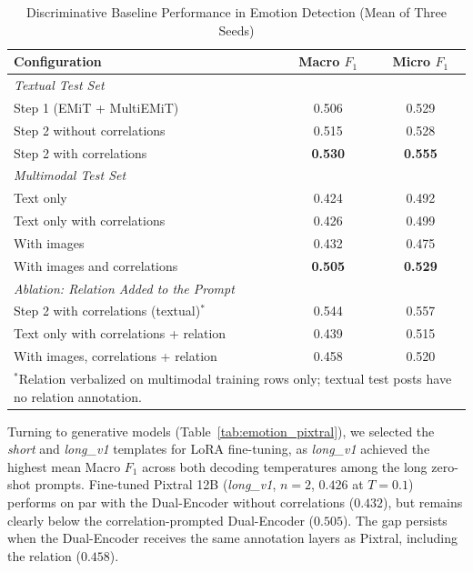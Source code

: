 \begin{table}[!t]
\centering
\caption{Discriminative Baseline Performance in Emotion Detection (Mean of Three Seeds)}
\label{tab:emotion_baselines}
\footnotesize
\renewcommand{\arraystretch}{1.05}
\begin{tabular}{l c c}
\hline
\textbf{Configuration} & \textbf{Macro $F_1$} & \textbf{Micro $F_1$} \\
\hline
\multicolumn{3}{l}{\textit{Textual Test Set}} \\
Step 1 (EMiT + MultiEMiT) & 0.506 & 0.529 \\
Step 2 without correlations & 0.515 & 0.528 \\
Step 2 with correlations & \textbf{0.530} & \textbf{0.555} \\
\hline
\multicolumn{3}{l}{\textit{Multimodal Test Set}} \\
Text only & 0.424 & 0.492 \\
Text only with correlations & 0.426 & 0.499 \\
With images & 0.432 & 0.475 \\
With images and correlations & \textbf{0.505} & \textbf{0.529} \\
\hline
\multicolumn{3}{l}{\textit{Ablation: Relation Added to the Prompt}} \\
Step 2 with correlations (textual)$^{*}$ & 0.544 & 0.557 \\
Text only with correlations + relation & 0.439 & 0.515 \\
With images, correlations + relation & 0.458 & 0.520 \\
\hline
\multicolumn{3}{p{0.92\columnwidth}}{\footnotesize $^{*}$Relation verbalized on multimodal training rows only; textual test posts have no relation annotation.} \\
\end{tabular}
\end{table}

Turning to generative models (Table~\ref{tab:emotion_pixtral}), we selected the \textit{short} and \textit{long\_v1} templates for LoRA fine-tuning, as \textit{long\_v1} achieved the highest mean Macro $F_1$ across both decoding temperatures among the long zero-shot prompts. Fine-tuned Pixtral 12B (\textit{long\_v1}, $n=2$, $0.426$ at $T=0.1$) performs on par with the Dual-Encoder without correlations ($0.432$), but remains clearly below the correlation-prompted Dual-Encoder ($0.505$). The gap persists when the Dual-Encoder receives the same annotation layers as Pixtral, including the relation ($0.458$).

